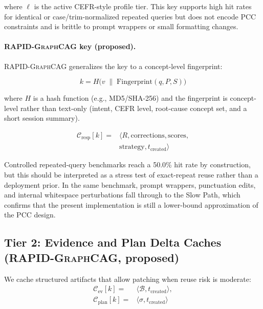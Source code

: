 \documentclass[11pt,a4paper,twocolumn]{article}
\newcommand{\rapid}{\textsc{RAPID-GraphCAG}}
\begin{document}
\noindent where $\ell$ is the active CEFR-style profile tier. This key supports high hit rates for identical or case/trim-normalized repeated queries but does not encode PCC constraints and is brittle to prompt wrappers or small formatting changes.

\paragraph{\rapid{} key (proposed).} \rapid{} generalizes the key to a concept-level fingerprint:

\begin{equation}
\label{eq:cache_key}
k = H\big(v \;\|\; \text{Fingerprint}(q, P, S)\big)
\end{equation}

\noindent where $H$ is a hash function (e.g., MD5/SHA-256) and the fingerprint is concept-level rather than text-only (intent, CEFR level, root-cause concept set, and a short session summary).

\begin{equation}
\begin{aligned}
\mathcal{C}_\text{resp}[k] ={}& \langle R, \text{corrections}, \text{scores}, \\
& \text{strategy}, t_\text{created} \rangle
\end{aligned}
\end{equation}

\noindent Controlled repeated-query benchmarks reach a 50.0\% hit rate by construction, but this should be interpreted as a stress test of exact-repeat reuse rather than a deployment prior. In the same benchmark, prompt wrappers, punctuation edits, and internal whitespace perturbations fall through to the Slow Path, which confirms that the present implementation is still a lower-bound approximation of the PCC design.

\subsection{Tier 2: Evidence and Plan Delta Caches (\rapid{}, proposed)}

We cache structured artifacts that allow patching when reuse risk is moderate:
\begin{equation}
\begin{aligned}
\mathcal{C}_\text{ev}[k] ={}& \langle \mathcal{B}, t_\text{created} \rangle, \\
\mathcal{C}_\text{plan}[k] ={}& \langle \sigma, t_\text{created} \rangle
\end{aligned}
\end{equation}
\end{document}
